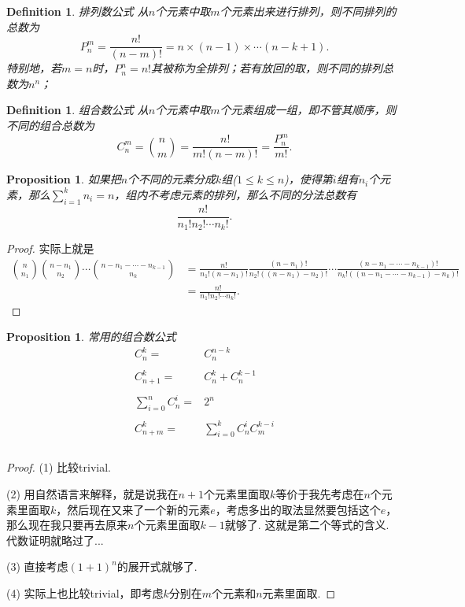 \documentclass{article}
\newtheorem{proposition}[theorem]{Proposition}
\newtheorem{definition}[theorem]{Definition}
\begin{document}
\begin{definition}
\rm {\color{red} 排列数公式} 从$n$个元素中取$m$个元素出来进行排列，则不同排列的总数为
$$
P^m_n = \frac{n!}{(n-m)!} = n\times(n-1)\times\cdots(n-k+1).
$$
特别地，若$m=n$时，$P^n_n = n!$其被称为{\color{red}全排列}；若有放回的取，则不同的排列总数为$n^n$；
\end{definition}

\begin{definition}
\rm {\color{red} 组合数公式} 从$n$个元素中取$m$个元素组成一组，即不管其顺序，则不同的组合总数为
$$
C^m_n = \binom nm  = \frac{n!}{m!(n-m)!} = \frac{P^m_n}{m!}. 
$$
\end{definition}

\begin{proposition}
\rm 如果把$n$个不同的元素分成$k$组($1\leq k \leq n$)，使得第$i$组有$n_i$个元素，那么$\sum\limits_{i=1}^k n_i = n$，组内不考虑元素的排列，那么不同的分法总数有
$$
\frac{n!}{n_1!n_2!\cdots n_k!}.
$$
\end{proposition}

\begin{proof}
实际上就是
$$
\begin{array}{ll}
\binom {n}{n_1} \binom{n-n_1}{n_2} \cdots \binom{n-n_1-\cdots-n_{k-1}}{n_k} &= \frac{n!}{n_1!(n-n_1)!} \frac{(n-n_1)!}{n_2!((n-n_1)-n_2)!}\cdots \frac{(n-n_1-\cdots-n_{k-1})!}{n_k!((n-n_1-\cdots-n_{k-1})-n_{k})!} \\
&= \frac{n!}{n_1!n_2!\cdots n_k!}.
\end{array}
$$
\end{proof}

\begin{proposition}
\rm {\color{red} 常用的组合数公式}
$$
\begin{array}{rl}
C^k_n =& C^{n-k}_n \\ \\
C^k_{n+1} =& C^k_n + C^{k-1}_n \\ \\
\sum\limits_{i=0}^n C^i_n =& 2^n \\ \\
C^k_{n+m} =& \sum\limits_{i=0}^k C^i_n C^{k-i}_m \\ \\
\end{array}
$$
\end{proposition}

\begin{proof}
(1) 比较trivial.

(2) 用自然语言来解释，就是说我在$n+1$个元素里面取$k$等价于我先考虑在$n$个元素里面取$k$，然后现在又来了一个新的元素$e$，考虑多出的取法显然要包括这个$e$，那么现在我只要再去原来$n$个元素里面取$k-1$就够了. 这就是第二个等式的含义. 代数证明就略过了...

(3) 直接考虑$(1+1)^n$的展开式就够了.

(4) 实际上也比较trivial，即考虑$k$分别在$m$个元素和$n$元素里面取.
\end{proof}
\end{document}
